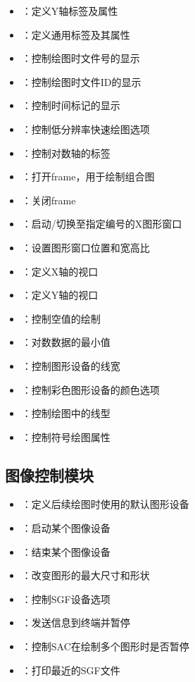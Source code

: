\begin{itemize}
\item {}：定义Y轴标签及属性
\item {}：定义通用标签及其属性
\item {}：控制绘图时文件号的显示
\item {}：控制绘图时文件ID的显示
\item {}：控制时间标记的显示
\item {}：控制低分辨率快速绘图选项
\item {}：控制对数轴的标签
\item {}：打开frame，用于绘制组合图
\item {}：关闭frame
\item {}：启动/切换至指定编号的X图形窗口
\item {}：设置图形窗口位置和宽高比
\item {}：定义X轴的视口
\item {}：定义Y轴的视口
\item {}：控制空值的绘制
\item {}：对数数据的最小值
\item {}：控制图形设备的线宽
\item {}：控制彩色图形设备的颜色选项
\item {}：控制绘图中的线型
\item {}：控制符号绘图属性
\end{itemize}

\subsection*{图像控制模块}
\begin{itemize}
\item {}：定义后续绘图时使用的默认图形设备
\item {}：启动某个图像设备
\item {}：结束某个图像设备
\item {}：改变图形的最大尺寸和形状
\item {}：控制SGF设备选项
\item {}：发送信息到终端并暂停
\item {}：控制SAC在绘制多个图形时是否暂停
\item {}：打印最近的SGF文件
\end{itemize}


